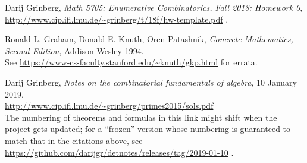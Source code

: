 \documentclass[paper=a4, fontsize=12pt]{scrartcl} %
\theoremstyle{plainsl}
\theoremstyle{definition}
\theoremstyle{remark}
\begin{document}
\begin{thebibliography}{99999999}                                                                                         %


Darij Grinberg,
\textit{Math 5705: Enumerative Combinatorics,
Fall 2018: Homework 0},
\url{http://www.cip.ifi.lmu.de/~grinberg/t/18f/hw-template.pdf} .

Ronald L. Graham, Donald E. Knuth, Oren Patashnik,
\textit{Concrete Mathematics, Second Edition}, Addison-Wesley 1994.\\
See \url{https://www-cs-faculty.stanford.edu/~knuth/gkp.html} for errata.

Darij Grinberg,
\textit{Notes on the combinatorial fundamentals of algebra},
10 January 2019. \\
\url{http://www.cip.ifi.lmu.de/~grinberg/primes2015/sols.pdf}
\\
The numbering of theorems and formulas in this link might shift
when the project gets updated; for a ``frozen'' version whose
numbering is guaranteed to match that in the citations above, see
\url{https://github.com/darijgr/detnotes/releases/tag/2019-01-10} .

\end{thebibliography}
\end{document}
